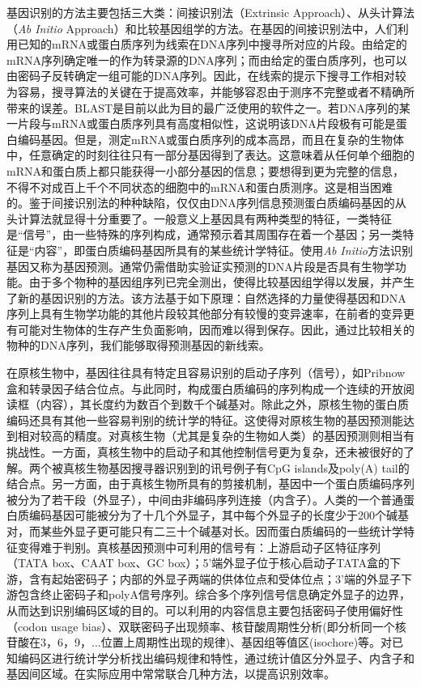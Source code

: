 基因识别的方法主要包括三大类：间接识别法（Extrinsic Approach）、从头计算法（\textit{Ab Initio} Approach）和比较基因组学的方法。在基因的间接识别法中，人们利用已知的mRNA或蛋白质序列为线索在DNA序列中搜寻所对应的片段。由给定的mRNA序列确定唯一的作为转录源的DNA序列；而由给定的蛋白质序列，也可以由密码子反转确定一组可能的DNA序列。因此，在线索的提示下搜寻工作相对较为容易，搜寻算法的关键在于提高效率，并能够容忍由于测序不完整或者不精确所带来的误差。BLAST是目前以此为目的最广泛使用的软件之一。若DNA序列的某一片段与mRNA或蛋白质序列具有高度相似性，这说明该DNA片段极有可能是蛋白编码基因。但是，测定mRNA或蛋白质序列的成本高昂，而且在复杂的生物体中，任意确定的时刻往往只有一部分基因得到了表达。这意味着从任何单个细胞的mRNA和蛋白质上都只能获得一小部分基因的信息；要想得到更为完整的信息，不得不对成百上千个不同状态的细胞中的mRNA和蛋白质测序。这是相当困难的。鉴于间接识别法的种种缺陷，仅仅由DNA序列信息预测蛋白质编码基因的从头计算法就显得十分重要了。一般意义上基因具有两种类型的特征，一类特征是“信号”，由一些特殊的序列构成，通常预示着其周围存在着一个基因；另一类特征是“内容”，即蛋白质编码基因所具有的某些统计学特征。使用\textit{Ab Initio}方法识别基因又称为基因预测。通常仍需借助实验证实预测的DNA片段是否具有生物学功能。由于多个物种的基因组序列已完全测出，使得比较基因组学得以发展，并产生了新的基因识别的方法。该方法基于如下原理：自然选择的力量使得基因和DNA序列上具有生物学功能的其他片段较其他部分有较慢的变异速率，在前者的变异更有可能对生物体的生存产生负面影响，因而难以得到保存。因此，通过比较相关的物种的DNA序列，我们能够取得预测基因的新线索。

在原核生物中，基因往往具有特定且容易识别的启动子序列（信号），如Pribnow盒和转录因子结合位点。与此同时，构成蛋白质编码的序列构成一个连续的开放阅读框（内容），其长度约为数百个到数千个碱基对。除此之外，原核生物的蛋白质编码还具有其他一些容易判别的统计学的特征。这使得对原核生物的基因预测能达到相对较高的精度。对真核生物（尤其是复杂的生物如人类）的基因预测则相当有挑战性。一方面，真核生物中的启动子和其他控制信号更为复杂，还未被很好的了解。两个被真核生物基因搜寻器识别到的讯号例子有CpG islands及poly(A) tail的结合点。另一方面，由于真核生物所具有的剪接机制，基因中一个蛋白质编码序列被分为了若干段（外显子），中间由非编码序列连接（内含子）。人类的一个普通蛋白质编码基因可能被分为了十几个外显子，其中每个外显子的长度少于200个碱基对，而某些外显子更可能只有二三十个碱基对长。因而蛋白质编码的一些统计学特征变得难于判别。真核基因预测中可利用的信号有：上游启动子区特征序列（TATA box、CAAT box、GC box）；5'端外显子位于核心启动子TATA盒的下游，含有起始密码子；内部的外显子两端的供体位点和受体位点；3'端的外显子下游包含终止密码子和polyA信号序列。综合多个序列信号信息确定外显子的边界，从而达到识别编码区域的目的。可以利用的内容信息主要包括密码子使用偏好性（codon usage bias）、双联密码子出现频率、核苷酸周期性分析(即分析同一个核苷酸在3，6，9，...位置上周期性出现的规律)、基因组等值区(isochore)等。对已知编码区进行统计学分析找出编码规律和特性，通过统计值区分外显子、内含子和基因间区域。在实际应用中常常联合几种方法，以提高识别效率。

